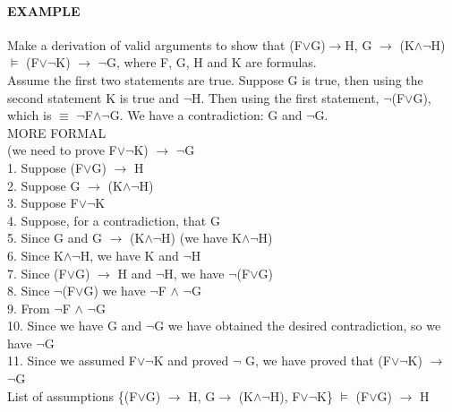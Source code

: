 \documentclass[10pt,letter]{article}
\begin{document}
\paragraph{EXAMPLE}
Make a derivation of valid arguments to show that (F$\vee$G)$\rightarrow$H, G $\rightarrow$ (K$\wedge\neg$H) $\models$ (F$\vee\neg$K) $\rightarrow$ $\neg$G, where F, G, H and K are formulas. \\ 
Assume the first two statements are true. Suppose G is true, then using the second statement K is true and $\neg$H. Then using the first statement, $\neg$(F$\vee$G), which is $\equiv$ $\neg$F$\wedge\neg$G. We have a contradiction: G and $\neg$G. \\
MORE FORMAL\\
(we need to prove F$\vee\neg$K) $\rightarrow$ $\neg$G\\
1. Suppose (F$\vee$G) $\rightarrow$ H\\ 
2. Suppose G $\rightarrow$ (K$\wedge\neg$H)\\
3. Suppose F$\vee\neg$K\\
4. Suppose, for a contradiction, that G\\
5. Since G and G $\rightarrow$ (K$\wedge\neg$H) (we have K$\wedge\neg$H)\\
6. Since K$\wedge\neg$H, we have K and $\neg$H\\
7. Since (F$\vee$G) $\rightarrow$ H and $\neg$H, we have $\neg$(F$\vee$G)\\
8. Since $\neg$(F$\vee$G) we have $\neg$F $\wedge$ $\neg$G\\
9. From $\neg$F $\wedge$ $\neg$G\\
10. Since we have G and $\neg$G we have obtained the desired contradiction, so we have $\neg$G\\
11. Since we assumed F$\vee\neg$K and proved $\neg$ G, we have proved that (F$\vee\neg$K) $\rightarrow$ $\neg$G\\

List of assumptions
\{(F$\vee$G) $\rightarrow$ H, G$\rightarrow$ (K$\wedge\neg$H), F$\vee\neg$K\} $\models$ (F$\vee$G) $\rightarrow$ H
\end{document}
